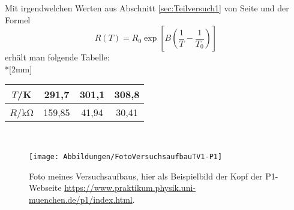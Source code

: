 \documentclass[a4paper,10pt]{report}
\begin{document}
	Mit irgendwelchen Werten aus Abschnitt \ref{sec:Teilversuch1} von 
	Seite \pageref{sec:Teilversuch1} 
	und der Formel
	\begin{equation}
	R(T) = R_0 \exp\left[ B \left( \frac{1}{T} - \frac{1}{T_0} \right) \right]
	\end{equation}
	erhält man folgende Tabelle:\\*[2mm]
	\begin{tabular}{c||c|c|c}
		$T$/\si{\kelvin} & 291,7 & 301,1 & 308,8 \\
		\hline
		$R$/\si{\kilo\ohm} & 159,85 & 41,94 & 30,41 \\
	\end{tabular} 
	\\
	
	\begin{figure}[!htb]
		\centering
		\texttt{[image: Abbildungen/FotoVersuchsaufbauTV1-P1]}
		\caption{Foto meines Versuchsaufbaus, hier als Beispielbild der Kopf der P1-Webseite \url{https://www.praktikum.physik.uni-muenchen.de/p1/index.html}.}
		\label{fig:VersuchsaufbauTV1}
	\end{figure} 	
\end{document}
